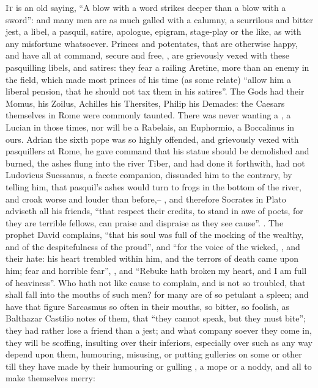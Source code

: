 \lettrine{I}{t} is an old saying, \enquote{A blow with a word
strikes deeper than a blow with a sword}: and many men are as much galled with
a calumny, a scurrilous and bitter jest, a libel, a pasquil, satire, apologue,
epigram, stage-play or the like, as with any misfortune whatsoever. Princes and
potentates, that are otherwise happy, and have all at command, secure and free,
, are grievously vexed with
these pasquilling libels, and satires: they fear a railing
Aretine, more than an enemy in the field, which made most
princes of his time (as some relate) \enquote{allow him a liberal pension, that he
should not tax them in his satires}. The Gods had their
Momus, \Homer{} his Zoilus, Achilles his Thersites, Philip his Demades: the
Caesars themselves in Rome were commonly taunted. There was never wanting a
\Petronius, a Lucian in those times, nor will be a Rabelais, an Euphormio, a
Boccalinus in ours. Adrian the sixth pope was so highly
offended, and grievously vexed with pasquillers at Rome, he gave command that
his statue should be demolished and burned, the ashes flung into the river
Tiber, and had done it forthwith, had not Ludovicus Suessanus, a facete
companion, dissuaded him to the contrary, by telling him, that pasquil's ashes
would turn to frogs in the bottom of the river, and croak worse and louder than
before,-- , and therefore
Socrates in Plato adviseth all his friends, \enquote{that respect
their credits, to stand in awe of poets, for they are terrible fellows, can
praise and dispraise as they see cause}. . The prophet David complains,  \enquote{that his
soul was full of the mocking of the wealthy, and of the despitefulness of the
proud}, and  \enquote{for the voice of the wicked, \etc{},
and their hate: his heart trembled within him, and the terrors of death came
upon him; fear and horrible fear}, \etc{}, and 
\enquote{Rebuke hath broken my heart, and I am full of heaviness}. Who hath not like
cause to complain, and is not so troubled, that shall fall into the mouths of
such men? for many are of so petulant a spleen; and have
that figure Sarcasmus so often in their mouths, so bitter, so foolish, as
Balthazar Castilio notes of them, that \enquote{they cannot speak,
but they must bite}; they had rather lose a friend than a jest; and what
company soever they come in, they will be scoffing, insulting over their
inferiors, especially over such as any way depend upon them, humouring,
misusing, or putting gulleries on some or other till they have made by their
humouring or gulling , a mope or a
noddy, and all to make themselves merry:


